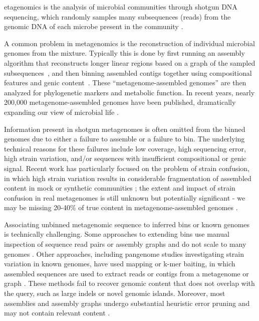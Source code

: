 etagenomics is the analysis of microbial communities through shotgun
DNA sequencing, which randomly samples many subsequences (reads)
from the genomic DNA of each microbe present in the community \cite{Quince2017}.

A common problem in metagenomics is the reconstruction of
individual microbial genomes from the mixture.
Typically this is
done by first running an assembly algorithm that reconstructs
longer linear regions based on a graph of the sampled
subsequences~\cite{pell2012scaling}, and then binning assembled
contigs together using compositional features and genic content~\cite{laczny2017busybee,lin2016accurate}.  These
``metagenome-assembled genomes'' are then
analyzed for phylogenetic markers and metabolic function. In recent years,
nearly 200,000 metagenome-assembled genomes have been published,
dramatically expanding our view of microbial life
\cite{Parks2017,Tully2018,Stewart2018,Delmont2018,Hug2016,Pasolli2019}.

Information present in shotgun metagenomes is often omitted from the
binned genomes due to either a failure to
assemble \cite{CAMI,Awad155358} or a failure to bin.  The underlying
technical reasons for these failures include low coverage, high
sequencing error, high strain variation, and/or sequences with
insufficient compositional or genic signal.  Recent work has
particularly focused on the problem of strain confusion, in which high
strain variation results in considerable fragmentation of assembled
content in mock or synthetic communities \cite{CAMI,Awad155358}; the
extent and impact of strain confusion in real metagenomes is still
unknown but potentially significant - we may be missing 20-40\% of
true content in metagenome-assembled
genomes \cite{brownstrain,Brito2016,baltic}.

Associating unbinned metagenomic sequence to inferred bins or known
genomes is technically challenging.  Some approaches to extending
bins use manual inspection of sequence read pairs or assembly graphs
and do not scale to many genomes
\cite{perchlorate,metacherchant}. Other approaches, including
pangenome studies investigating
strain variation in known genomes,
have used mapping or k-mer baiting, in which assembled sequences
are used to extract reads or contigs from a
metagenome or graph \cite{desman,Nayfach2016,ekg,mspminer,Petersen2016}.  These methods fail
to recover genomic content that does not overlap with the query, such
as large indels or novel genomic islands. Moreover, most assemblies
and assembly graphs undergo substantial heuristic error pruning and may not
contain relevant content
\cite{CAMI,Awad155358}.

